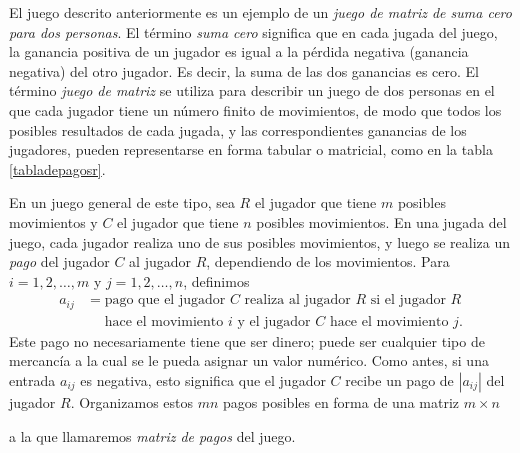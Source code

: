 El juego descrito anteriormente es un ejemplo de un \emph{juego de matriz de suma cero para dos personas}. El término \emph{suma cero} significa que en cada jugada del juego, la ganancia positiva de un jugador es igual a la pérdida negativa (ganancia negativa) del otro jugador. Es decir, la suma de las dos ganancias es cero. El término \emph{juego de matriz} se utiliza para describir un juego de dos personas en el que cada jugador tiene un número finito de movimientos, de modo que todos los posibles resultados de cada jugada, y las correspondientes ganancias de los jugadores, pueden representarse en forma tabular o matricial, como en la tabla \ref{tabladepagosr}.

En un juego general de este tipo, sea $R$ el jugador que tiene $m$ posibles movimientos y $C$ el jugador que tiene $n$ posibles movimientos. En una jugada del juego, cada jugador realiza uno de sus posibles movimientos, y luego se realiza un \emph{pago} del jugador $C$ al jugador $R$, dependiendo de los movimientos. Para $i = 1, 2, \dots, m$ y $j = 1, 2, \dots, n$, definimos
\begin{align*}
    a_{ij} & = \text{pago que el jugador } C \text{ realiza al jugador } R \text{ si el jugador } R \\
    & \quad\text{ hace el movimiento } i \text{ y el jugador } C \text{ hace el movimiento } j.
\end{align*}
Este pago no necesariamente tiene que ser dinero; puede ser cualquier tipo de mercancía a la cual se le pueda asignar un valor numérico. Como antes, si una entrada $a_{ij}$ es negativa, esto significa que el jugador $C$ recibe un pago de $|a_{ij}|$ del jugador $R$. Organizamos estos $mn$ pagos posibles en forma de una matriz $m \times n$
\begin{matrizn}
\end{matrizn}
a la que llamaremos \emph{matriz de pagos} del juego.

